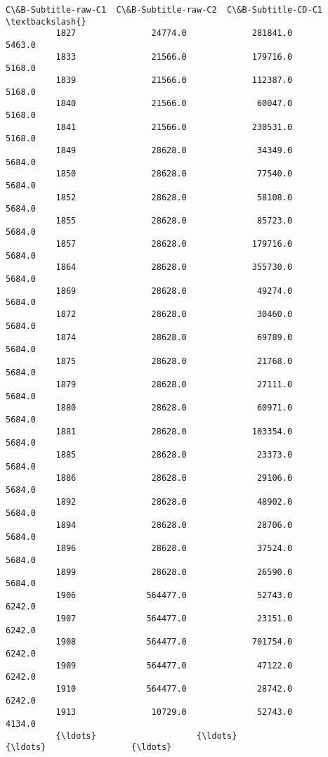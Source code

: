 \documentclass[11pt]{article}
\begin{document}
\begin{Verbatim}[commandchars=\\\{\}]
                 C\&B-Subtitle-raw-C1  C\&B-Subtitle-raw-C2  C\&B-Subtitle-CD-C1  \textbackslash{}
          1827               24774.0             281841.0              5463.0   
          1833               21566.0             179716.0              5168.0   
          1839               21566.0             112387.0              5168.0   
          1840               21566.0              60047.0              5168.0   
          1841               21566.0             230531.0              5168.0   
          1849               28628.0              34349.0              5684.0   
          1850               28628.0              77540.0              5684.0   
          1852               28628.0              58108.0              5684.0   
          1855               28628.0              85723.0              5684.0   
          1857               28628.0             179716.0              5684.0   
          1864               28628.0             355730.0              5684.0   
          1869               28628.0              49274.0              5684.0   
          1872               28628.0              30460.0              5684.0   
          1874               28628.0              69789.0              5684.0   
          1875               28628.0              21768.0              5684.0   
          1879               28628.0              27111.0              5684.0   
          1880               28628.0              60971.0              5684.0   
          1881               28628.0             103354.0              5684.0   
          1885               28628.0              23373.0              5684.0   
          1886               28628.0              29106.0              5684.0   
          1892               28628.0              48902.0              5684.0   
          1894               28628.0              28706.0              5684.0   
          1896               28628.0              37524.0              5684.0   
          1899               28628.0              26590.0              5684.0   
          1906              564477.0              52743.0              6242.0   
          1907              564477.0              23151.0              6242.0   
          1908              564477.0             701754.0              6242.0   
          1909              564477.0              47122.0              6242.0   
          1910              564477.0              28742.0              6242.0   
          1913               10729.0              52743.0              4134.0   
          {\ldots}                    {\ldots}                  {\ldots}                 {\ldots}   

\end{Verbatim}
\end{document}
